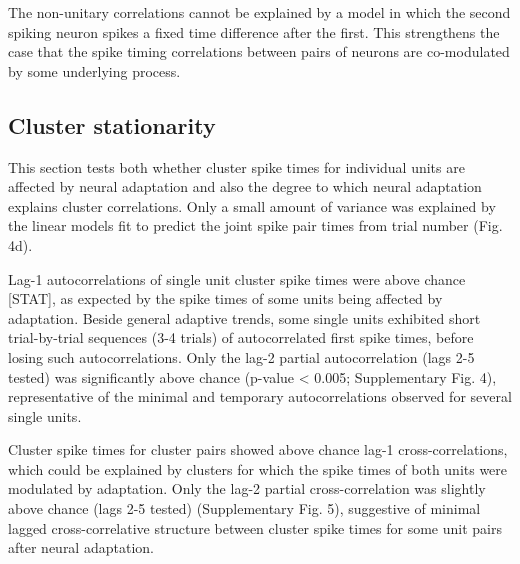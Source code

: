 \documentclass{article}
\begin{document}
The non-unitary correlations cannot be explained by a model in which the second spiking neuron spikes a fixed time difference after the first. 
This strengthens the case that the spike timing correlations between pairs of neurons are co-modulated by some underlying process. 




\subsection*{Cluster stationarity}

This section tests both whether cluster spike times for individual units are affected by neural adaptation and also the degree to which neural adaptation explains cluster correlations.
Only a small amount of variance was explained by the linear models fit to predict the joint spike pair times from trial number (Fig. 4d). 

Lag-1 autocorrelations of single unit cluster spike times were above chance [STAT], as expected by the spike times of some units being affected by adaptation.
Beside general adaptive trends, some single units exhibited short trial-by-trial sequences (3-4 trials) of autocorrelated first spike times, before losing such autocorrelations. 
 Only the lag-2 partial autocorrelation (lags 2-5 tested) was significantly above chance (p-value < 0.005; Supplementary Fig. 4), representative of the minimal and temporary autocorrelations observed for several single units. 


Cluster spike times for cluster pairs showed above chance lag-1 cross-correlations, which could be explained by clusters for which the spike times of both units were modulated by adaptation.
Only the lag-2 partial cross-correlation was slightly above chance (lags 2-5 tested) (Supplementary Fig. 5), suggestive of minimal lagged cross-correlative structure between cluster spike times for some unit pairs after neural adaptation. 

\end{document}
